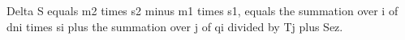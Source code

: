 Delta S equals m2 times s2 minus m1 times s1, equals the summation over i of dni times si plus the summation over j of qi divided by Tj plus Sez.